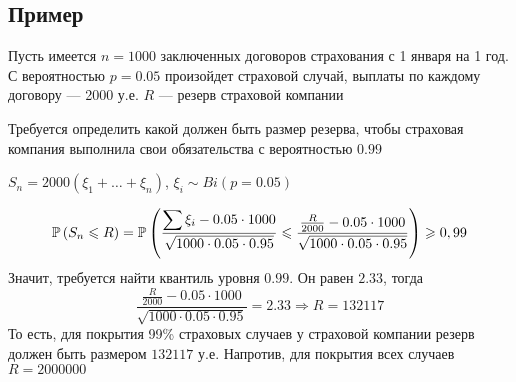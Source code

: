 \documentclass[a4paper, 10pt]{article}
\begin{document}
\subsection*{Пример}
Пусть имеется $n=1000$ заключенных договоров страхования с 1 января на 1 год. С вероятностью $p=0.05$ произойдет страховой случай, выплаты по каждому договору — 2000 у.е. $R$ — резерв страховой компании

Требуется определить какой должен быть размер резерва, чтобы страховая компания выполнила свои обязательства с вероятностью $0.99$

$S_n=2000(\xi_1+\ldots+\xi_n)$, $\xi_i\sim Bi(p=0.05)$

\begin{equation*}
    \prob{S_n\leqslant R}=\prob{\frac{\sum\xi_i-0.05\cdot1000}{\sqrt{1000\cdot0.05\cdot0.95}}\leqslant \frac{\frac{R}{2000}-0.05\cdot1000}{\sqrt{1000\cdot0.05\cdot0.95}}}\geqslant 0,99
\end{equation*}
Значит, требуется найти квантиль уровня $0.99$. Он равен $2.33$, тогда
\begin{equation*}
    \frac{\frac{R}{2000}-0.05\cdot1000}{\sqrt{1000\cdot0.05\cdot0.95}}=2.33\Longrightarrow R=132117
\end{equation*}
То есть, для покрытия 99\% страховых случаев у страховой компании резерв должен быть размером $132117$ у.е. Напротив, для покрытия всех случаев $R=2000000$
\end{document}
